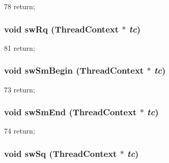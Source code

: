 \begin{DoxyCode}
78 { return; }
\end{DoxyCode}
\hypertarget{classCPA_ab92d30bfa0f9bc12c3077f46edc3eafc}{
\subsubsection[{swRq}]{\setlength{\rightskip}{0pt plus 5cm}void swRq ({\bf ThreadContext} $\ast$ {\em tc})}}
\label{classCPA_ab92d30bfa0f9bc12c3077f46edc3eafc}



\begin{DoxyCode}
81 { return; }
\end{DoxyCode}
\hypertarget{classCPA_a7427babcf2e82bc186486c0163ccfb0f}{
\subsubsection[{swSmBegin}]{\setlength{\rightskip}{0pt plus 5cm}void swSmBegin ({\bf ThreadContext} $\ast$ {\em tc})}}
\label{classCPA_a7427babcf2e82bc186486c0163ccfb0f}



\begin{DoxyCode}
73 { return; }
\end{DoxyCode}
\hypertarget{classCPA_a9e02cda5650796a3814bd7f448988423}{
\subsubsection[{swSmEnd}]{\setlength{\rightskip}{0pt plus 5cm}void swSmEnd ({\bf ThreadContext} $\ast$ {\em tc})}}
\label{classCPA_a9e02cda5650796a3814bd7f448988423}



\begin{DoxyCode}
74 { return; }
\end{DoxyCode}
\hypertarget{classCPA_af481dac3d5349528119d190eaafafe5d}{
\subsubsection[{swSq}]{\setlength{\rightskip}{0pt plus 5cm}void swSq ({\bf ThreadContext} $\ast$ {\em tc})}}
\label{classCPA_af481dac3d5349528119d190eaafafe5d}



